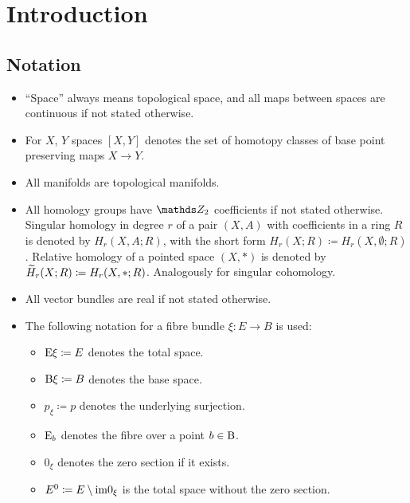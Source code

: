 % 

\chapter*{Introduction}

\section*{Notation}
\begin{itemize}
\item \enquote{Space} always means topological space, and all maps
  between spaces are continuous if not stated otherwise.
\item For $X$, $Y$ spaces $[X,Y]$ denotes the set of homotopy classes
  of base point preserving maps $X\to Y$.
\item All manifolds are topological manifolds.
\item All homology groups have $\Zmod2$ coefficients if not stated
  otherwise. Singular homology in degree $r$ of a pair $(X,A)$ with
  coefficients in a ring $R$ is denoted by $H_r(X,A;R)$, with the
  short form $H_r(X;R)\coloneqq H_r(X,\emptyset;R)$. Relative homology
  of a pointed space $(X,\ast)$ is denoted by $\widetilde{H}_r(X;R)\coloneqq
  H_r(X,\ast;R)$. Analogously for singular cohomology.
\item All vector bundles are real if not stated otherwise.
\item The following notation for a fibre bundle $\xi\colon E\to B$ is used:
  \begin{itemize}
  \item $\mathrm{E}\xi\coloneqq E$ denotes the total space.
  \item $\mathrm{B}\xi\coloneqq B$ denotes the base space.
  \item $p_\xi\coloneqq p$ denotes the underlying surjection.
  \item $\mathrm{E}_b$ denotes the fibre over a point $b\in \B$.
  \item $0_\xi$ denotes the zero section if it exists.
  \item ${E}^0\coloneqq E\setminus\mathrm{im}0_{\xi}$
    is the total space without the zero section.

\end{itemize}
\end{itemize}
